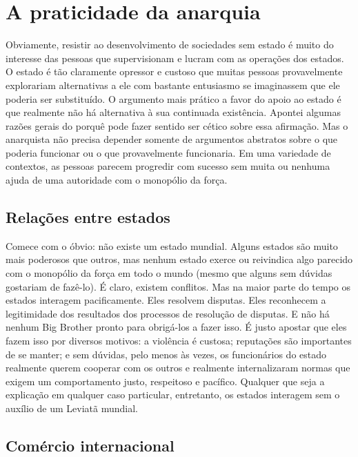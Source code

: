 \section{A praticidade da anarquia}

Obviamente, resistir ao desenvolvimento de sociedades sem estado é muito do interesse das pessoas que supervisionam e lucram com as operações dos estados. O estado é tão claramente opressor e custoso que muitas pessoas provavelmente explorariam alternativas a ele com bastante entusiasmo se imaginassem que ele poderia ser substituído. O argumento mais prático a favor do apoio ao estado é que realmente não há alternativa à sua continuada existência. Apontei algumas razões gerais do porquê pode fazer sentido ser cético sobre essa afirmação. Mas o anarquista não precisa depender somente de argumentos abstratos sobre o que poderia funcionar ou o que provavelmente funcionaria. Em uma variedade de contextos, as pessoas parecem progredir com sucesso sem muita ou nenhuma ajuda de uma autoridade com o monopólio da força.

\subsection*{Relações entre estados}

Comece com o óbvio: não existe um estado mundial. Alguns estados são muito mais poderosos que outros, mas nenhum estado exerce ou reivindica algo parecido com o monopólio da força em todo o mundo (mesmo que alguns sem dúvidas gostariam de fazê-lo). É claro, existem conflitos. Mas na maior parte do tempo os estados interagem pacificamente. Eles resolvem disputas. Eles reconhecem a legitimidade dos resultados dos processos de resolução de disputas. E não há nenhum Big Brother pronto para obrigá-los a fazer isso. É justo apostar que eles fazem isso por diversos motivos: a violência é custosa; reputações são importantes de se manter; e sem dúvidas, pelo menos às vezes, os funcionários do estado realmente querem cooperar com os outros e realmente internalizaram normas que exigem um comportamento justo, respeitoso e pacífico. Qualquer que seja a explicação em qualquer caso particular, entretanto, os estados interagem sem o auxílio de um Leviatã mundial.

\subsection*{Comércio internacional}


